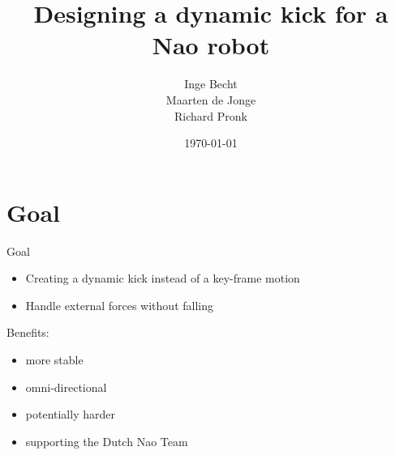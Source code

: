 \documentclass{beamer}
\begin{document}
\title{Designing a dynamic kick for a Nao robot}
\author{Inge Becht \\ Maarten de Jonge \\ Richard Pronk}
\date{\today}


\begin{frame}
  \titlepage
\end{frame}

\section{Goal}
\begin{frame}{Goal}
  \begin{itemize}
    \item Creating a dynamic kick instead of a key-frame motion
    \item Handle external forces without falling
  \end{itemize}
  \pause
  Benefits:
  \begin{itemize}
    \item more stable
    \item omni-directional
    \item potentially harder
    \item supporting the Dutch Nao Team
  \end{itemize}
\end{frame}
\end{document}

